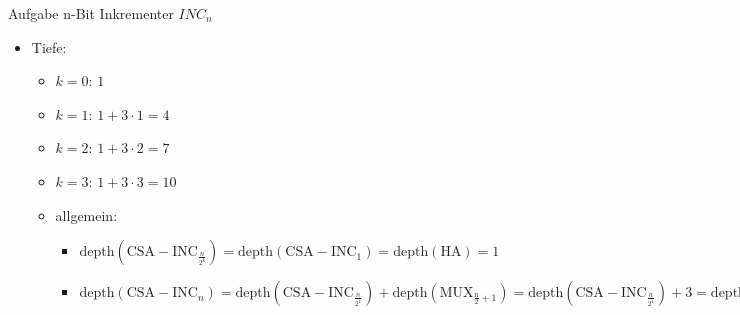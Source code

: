 \begin{frame}{Aufgabe \thesection}{n-Bit Inkrementer $INC_n$}
  \begin{solution}
    \begin{itemize}
      \setlength{\itemsep}{0cm}
      \setlength{\parsep}{0cm}
      \setlength{\parskip}{0.2cm}
      \item \alert{Tiefe:}
      \begin{itemize}
        \item \alert{$k=0$:} $1$ 
        \item \alert{$k=1$:} $1 + 3\cdot 1 = 4$ 
        \item \alert{$k=2$:} $1 + 3\cdot 2 = 7$ 
        \item \alert{$k=3$:} $1 + 3\cdot 3 = 10$ 
        \item \alert{allgemein:} 
        \begin{itemize}
          \item $\mathrm{depth}(\mathrm{CSA-INC}_{\frac{n}{2^k} }) = \mathrm{depth}(\mathrm{CSA-INC}_{1}) = \mathrm{depth}(\mathrm{HA}) = 1$
          \item $\mathrm{depth}(\mathrm{CSA-INC}_{n}) = \mathrm{depth}(\mathrm{CSA-INC}_{\frac{n}{2^1}}) + \mathrm{depth}(\mathrm{MUX_{\frac{n}{2}+1}}) = \mathrm{depth}(\mathrm{CSA-INC}_{\frac{n}{2^1}}) + 3 = \mathrm{depth}(\mathrm{CSA-INC}_{\frac{n}{2^2}}) + 3 + 3 = \mathrm{depth}(\mathrm{CSA-INC}_{\frac{n}{2^k}}) + 3 \cdot k = 3\cdot k + 1= 3\cdot log(n) + 1$
        \end{itemize}
      \end{itemize}
    \end{itemize}
  \end{solution}
\end{frame}

